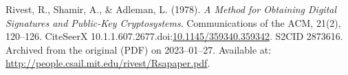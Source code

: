 \documentclass[12pt,a4paper]{report}
\begin{document}

\begin{thebibliography}{9}
    Rivest, R., Shamir, A., \& Adleman, L. (1978). 
    \textit{A Method for Obtaining Digital Signatures and Public-Key Cryptosystems}. 
    Communications of the ACM, 21(2), 120--126. 
    CiteSeerX 10.1.1.607.2677.\space doi:\href{https://doi.org/10.1145/359340.359342}{10.1145/359340.359342}. S2CID 2873616. 
    Archived from the original (PDF) on 2023--01--27.\@ 
    Available at: \url{http://people.csail.mit.edu/rivest/Rsapaper.pdf}.
\end{thebibliography}
\end{document}
